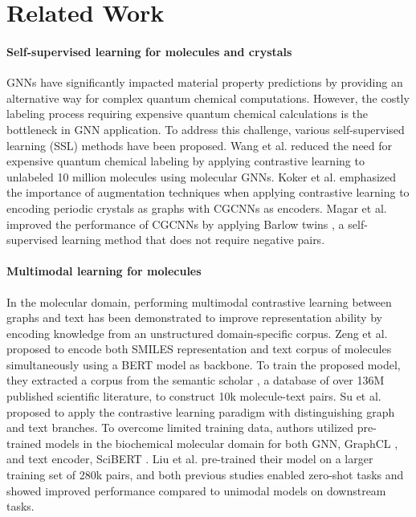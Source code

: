\section{Related Work}
\paragraph{Self-supervised learning for molecules and crystals}

GNNs have significantly impacted material property predictions \cite{xie2018CGCNN, gilmer2017MPNN} by providing an alternative way for complex quantum chemical computations. However, the costly labeling process requiring expensive quantum chemical calculations is the bottleneck in GNN application. To address this challenge, various self-supervised learning (SSL) methods have been proposed. Wang et al. \cite{wang2022MolCLR} reduced the need for expensive quantum chemical labeling by applying contrastive learning to unlabeled 10 million molecules using molecular GNNs. Koker et al. \cite{koker2022CrystalCLR} emphasized the importance of augmentation techniques when applying contrastive learning to encoding periodic crystals as graphs with CGCNNs as encoders. Magar et al. \cite{magar2022CrystalTwins} improved the performance of CGCNNs by applying Barlow twins \cite{zbontar2021barlowtwins}, a self-supervised learning method that does not require negative pairs.

\paragraph{Multimodal learning for molecules}
In the molecular domain, performing multimodal contrastive learning between graphs and text has been demonstrated to improve representation ability by encoding knowledge from an unstructured domain-specific corpus. Zeng et al. \cite{zeng2022KV-PLM} proposed to encode both SMILES \cite{weininger1988smiles, weininger1989smiles} representation and text corpus of molecules simultaneously using a BERT \cite{devlin2018BERT} model as backbone. To train the proposed model, they extracted a corpus from the semantic scholar \cite{lo2019s2orc}, a database of over 136M published scientific literature, to construct 10k molecule-text pairs. Su et al. \cite{su2022MoMu} proposed to apply the contrastive learning paradigm with distinguishing graph and text branches. To overcome limited training data, authors utilized pre-trained models in the biochemical molecular domain for both GNN, GraphCL \cite{you2020GraphCL}, and text encoder, SciBERT \cite{beltagy2019scibert}. Liu et al. \cite{liu2023MoleculeSTM} pre-trained their model on a larger training set of 280k pairs, and both previous studies enabled zero-shot tasks and showed improved performance compared to unimodal models on downstream tasks.

